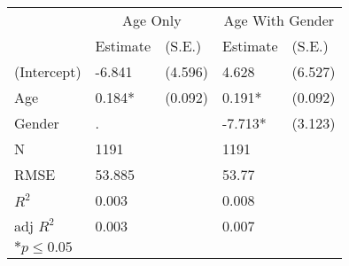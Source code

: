 \begin{tabular}{*{5}{l}}
 \hline
                &\multicolumn{2}{c}{Age Only} &\multicolumn{2}{c}{Age With Gender}   \\
                &Estimate &(S.E.)  &Estimate &(S.E.) \\
 \hline
 \hline
  (Intercept)    & -6.841  &   (4.596) &  4.628  &   (6.527) \\
  Age            &  0.184*  &   (0.092) &  0.191*  &   (0.092) \\
  Gender          & .       &         & -7.713*  &   (3.123) \\
 \hline 
 N                &1191      &      &1191      &       \\
 RMSE            &53.885        &&53.77        & \\
 $R^2$           &0.003        &&0.008        & \\
 adj $R^2$       &0.003        &&0.007        & \\
 \hline
 \hline
 
 \multicolumn{2}{l}{${*}  p \le 0.05$   }\\
 \end{tabular}